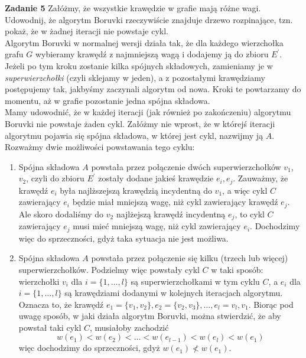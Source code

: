 \documentclass[a4paper,12pt]{article}
\begin{document}
\newpage
\noindent \textbf{Zadanie 5} \newline
Załóżmy, że wszystkie krawędzie w grafie mają różne wagi. Udowodnij, że 
algorytm Boruvki rzeczywiście znajduje drzewo rozpinające, tzn. pokaż, 
że w żadnej iteracji nie powstaje cykl. \\

\noindent Algorytm Boruvki w normalnej wersji działa tak, że dla każdego
wierzchołka grafu $G$ wybieramy krawędź z najmniejszą wagą i dodajemy ją
do zbioru $E^\prime$. Jeżeli po tym kroku zostanie kilka spójnych składowych,
zamieniamy je w \textit{superwierzchołki} (czyli sklejamy w jeden), 
a z pozostałymi krawędziamy postępujemy tak, jakbyśmy zaczynali algorytm od
nowa. Kroki te powtarzamy do momentu, aż w grafie pozostanie jedna spójna
składowa. \\

\noindent Mamy udowodnić, że w każdej iteracji (jak również po zakończeniu)
algorytmu Boruvki nie powstaje żaden cykl. Załóżmy nie wprost, że w którejś
iteracji algorytmu pojawia się spójna składowa, w której jest cykl, nazwijmy
ją $A$. Rozważmy dwie możliwości powstawania tego cyklu:
\begin{enumerate}
    \item Spójna składowa $A$ powstała przez połączenie dwóch superwierzchołków
    $v_1$, $v_2$, czyli do zbioru $E^\prime$ zostały dodane jakieś krawędzie
    $e_i, e_j$. Zauważmy, że krawędź $e_i$ była najlższejszą krawędzią
    incydentną do $v_1$, a więc cykl $C$ zawierający $e_i$ będzie miał mniejszą
    wagę, niż cykl zawierający krawędź $e_j$. Ale skoro dodaliśmy do $v_2$
    najlżejszą krawędź incydentną $e_j$, to cykl $C$ zawierający $e_j$ musi
    mieć mniejszą wagę, niż cykl zawierający $e_i$. Dochodzimy więc do
    sprzeczności, gdyż taka sytuacja nie jest możliwa.
    \item Spójna składowa $A$ powstała przez połączenie się kilku (trzech
    lub więcej) superwierzchołków. Podzielmy więc powstały cykl $C$ w taki
    sposób: wierzchołki $v_i$ dla $i = \{ 1, \ldots, l \}$ są superwierzchołkami
    w tym cyklu $C$, a $e_i$ dla $i = \{ 1, \ldots, l \}$ są krawędziami dodanymi
    w kolejnych iteracjach algorytmu. Oznacza to, że krawędź $e_1 = \{v_1, v_2\},
    e_2 = \{ v_2, v_3 \}, \ldots, e_l = {v_l, v_1}$. Biorąc pod uwagę sposób, 
    w jaki działa algorytm Boruvki, można stwierdzić, że aby powstał taki cykl $C$,
    musiałoby zachodzić 
    \[ w(e_1) < w(e_2) < \ldots < w(e_{l-1}) < w(e_l) < w(e_1) \]
    więc dochodzimy do sprzeczności, gdyż $w(e_1) \nless w(e_1)$.
\end{enumerate}
\end{document}
